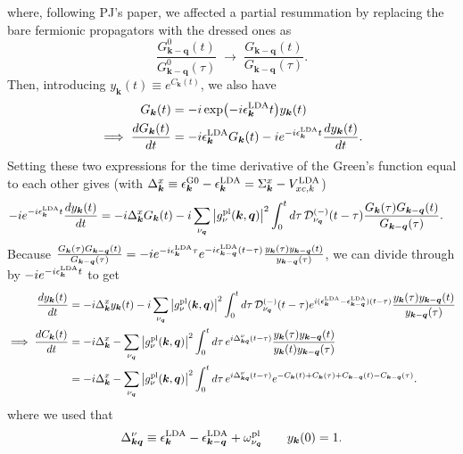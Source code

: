 where, following PJ's paper, we affected a partial resummation by replacing the bare fermionic propagators with the dressed ones as
\begin{equation}
\frac{G_{\bm{k}-\bm{q}}^{0}(t)}
     {G_{\bm{k}-\bm{q}}^{0}(\tau)}
\;\longrightarrow\;
\frac{G_{\bm{k}-\bm{q}}(t)}
     {G_{\bm{k}-\bm{q}}(\tau)}.
\end{equation}
Then, introducing $y_{\bm{k}}(t)\equiv e^{C_{\bm{k}}(t)}$, we also have
\begin{align}
G_{\bm{k}}(t)&=-i\exp(-i\epsilon_{\bm{k}}^{\rm LDA}t)y_{\bm{k}}(t)\\ \implies
\frac{dG_{\bm{k}}(t)}{dt}&=
-i\epsilon_{\bm{k}}^{\rm LDA}G_{\bm{k}}(t)
-i e^{-i\epsilon_{\bm{k}}^{\rm LDA}t}
\frac{dy_{\bm{k}}(t)}{dt}.
\end{align}
Setting these two expressions for the time derivative of the Green's function equal to each other gives (with $\Delta_{\bm{k}}^x\equiv \epsilon_{\bm{k}}^{\rm G0}-\epsilon_{\bm{k}}^{\rm LDA}=\Sigma_{\bm{k}}^x-V_{x c, k}^{\mathrm{LDA}}$)
\begin{align}
-i e^{-i\epsilon_{\bm{k}}^{\rm LDA}t}
\frac{dy_{\bm{k}}(t)}{dt}
&=
-i\Delta_{\bm{k}}^x G_{\bm{k}}(t)
-i
\sum_{\nu_{\bm q}}
\left|g_\nu^{\rm pl}(\bm{k},\bm q)\right|^2
\int_0^t d\tau\,
\mathcal D_{\nu_{\bm q}}^{(-)}(t-\tau)
\frac{
G_{\bm{k}}(\tau)G_{\bm{k}-\bm q}(t)
}{
G_{\bm{k}-\bm q}(\tau)
}.
\end{align}
Because $\frac{
G_{\bm{k}}(\tau)G_{\bm{k}-\bm q}(t)
}{
G_{\bm{k}-\bm q}(\tau)
}
=
-i e^{-i\epsilon_{\bm{k}}^{\rm LDA}\tau}
e^{-i\epsilon_{\bm{k}-\bm q}^{\rm LDA}(t-\tau)}
\frac{
y_{\bm{k}}(\tau)y_{\bm{k}-\bm q}(t)
}{
y_{\bm{k}-\bm q}(\tau)
}$, we can divide through by
\(
-i e^{-i\epsilon_{\bm{k}}^{\rm LDA}t}
\)
to get
\begin{align}
\frac{dy_{\bm{k}}(t)}{dt}
&=
-i\Delta_{\bm{k}}^x y_{\bm{k}}(t)
-i
\sum_{\nu_{\bm q}}
\left|g_\nu^{\rm pl}(\bm{k},\bm q)\right|^2
\int_0^t d\tau\,
\mathcal D_{\nu_{\bm q}}^{(-)}(t-\tau)
e^{i(\epsilon_{\bm{k}}^{\rm LDA}
-\epsilon_{\bm{k}-\bm q}^{\rm LDA})(t-\tau)}
\frac{
y_{\bm{k}}(\tau)y_{\bm{k}-\bm q}(t)
}{
y_{\bm{k}-\bm q}(\tau)
}\\
\implies \frac{dC_{\bm{k}}(t)}{dt}
&=
-i\Delta_{\bm{k}}^x
-
\sum_{\nu_{\bm q}}
\left|g_\nu^{\rm pl}(\bm{k},\bm q)\right|^2
\int_0^t d\tau\,
e^{i\Delta_{\bm{k}\bm q}^{\nu}(t-\tau)}
\frac{
y_{\bm{k}}(\tau)y_{\bm{k}-\bm q}(t)
}{
y_{\bm{k}}(t)y_{\bm{k}-\bm q}(\tau)
}
\\
&=
-i\Delta_{\bm{k}}^x
-
\sum_{\nu_{\bm q}}
\left|g_\nu^{\rm pl}(\bm{k},\bm q)\right|^2
\int_0^t d\tau\,
e^{i\Delta_{\bm{k}\bm q}^{\nu}(t-\tau)}
e^{
-C_{\bm{k}}(t)+C_{\bm{k}}(\tau)
+C_{\bm{k}-\bm q}(t)-C_{\bm{k}-\bm q}(\tau)
}.
\end{align}
where we used that
\begin{equation}
\Delta_{\bm{k}\bm q}^{\nu}
\equiv
\epsilon_{\bm{k}}^{\rm LDA}
-\epsilon_{\bm{k}-\bm q}^{\rm LDA}
+\omega_{\nu_{\bm q}}^{\rm pl}
\qquad
y_{\bm{k}}(0)=1.
\end{equation}
